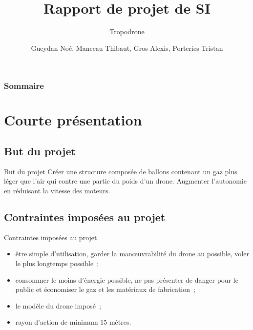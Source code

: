 \documentclass{beamer}
\title{Rapport de projet de SI}
\subtitle{Tropodrone}
\author{Gueydan Noé, Manceau Thibaut, Gros Alexis, Porteries Tristan}
\begin{document}
\begin{frame}
  \titlepage
\end{frame}

\begin{frame}
    \frametitle{Sommaire}
    \begin{multicols}{2}
      {
		\setcounter{tocdepth}{1}
        \tableofcontents
      }
    \end{multicols}
\end{frame}

\section{Courte présentation}

\subsection{But du projet}
\begin{frame}{But du projet}
 Créer une structure composée de ballons contenant un gaz plus léger que l’air qui contre une partie du poids d'un drone.
 Augmenter l’autonomie en réduisant la vitesse des moteurs.
\end{frame}

\subsection{Contraintes imposées au projet}
\begin{frame}{Contraintes imposées au projet}
  \begin{itemize}
    \item être simple d’utilisation, garder la manœuvrabilité du drone au possible, voler le plus longtemps possible~;
    \item consommer le moins d’énergie possible, ne pas présenter de danger pour le public et économiser le gaz et les matériaux de fabrication~;
    \item le modèle du drone imposé~;
    \item rayon d’action de minimum 15 mètres.
  \end{itemize}
\end{frame}
\end{document}
